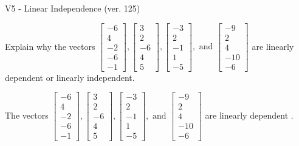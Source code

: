 \begin{exercise}
  \begin{exerciseTitle}V5 - Linear Independence (ver. 125)\end{exerciseTitle}
  \begin{exerciseStatement}
    Explain why the vectors \(\left[\begin{array}{r}
-6 \\
4 \\
-2 \\
-6 \\
-1
\end{array}\right] , \left[\begin{array}{r}
3 \\
2 \\
-6 \\
4 \\
5
\end{array}\right] , \left[\begin{array}{r}
-3 \\
2 \\
-1 \\
1 \\
-5
\end{array}\right] , \text{ and } \left[\begin{array}{r}
-9 \\
2 \\
4 \\
-10 \\
-6
\end{array}\right]\) are linearly dependent or linearly independent.	


  \end{exerciseStatement}
  \begin{exerciseAnswer}
   The vectors \(\left[\begin{array}{r}
-6 \\
4 \\
-2 \\
-6 \\
-1
\end{array}\right] , \left[\begin{array}{r}
3 \\
2 \\
-6 \\
4 \\
5
\end{array}\right] , \left[\begin{array}{r}
-3 \\
2 \\
-1 \\
1 \\
-5
\end{array}\right] , \text{ and } \left[\begin{array}{r}
-9 \\
2 \\
4 \\
-10 \\
-6
\end{array}\right]\) are 
  	 linearly dependent  .
  


  \end{exerciseAnswer}
\end{exercise}